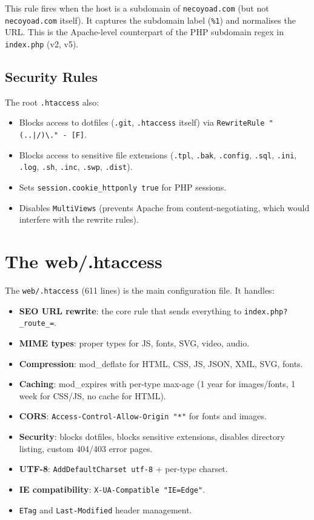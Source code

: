 \documentclass[11pt,a4paper]{article}
\begin{document}
This rule fires when the host is a subdomain of
\texttt{necoyoad.com} (but not \texttt{necoyoad.com} itself). It
captures the subdomain label (\texttt{\%1}) and normalises the URL.
This is the Apache-level counterpart of the PHP subdomain regex in
\texttt{index.php} (v2, v5).

\subsection{Security Rules}

The root \texttt{.htaccess} also:
\begin{itemize}[leftmargin=1.6em,itemsep=2pt]
  \item Blocks access to dotfiles (\texttt{.git}, \texttt{.htaccess}
        itself) via \texttt{RewriteRule "(..|/)\textbackslash{}." - [F]}.
  \item Blocks access to sensitive file extensions
        (\texttt{.tpl}, \texttt{.bak}, \texttt{.config}, \texttt{.sql},
        \texttt{.ini}, \texttt{.log}, \texttt{.sh}, \texttt{.inc},
        \texttt{.swp}, \texttt{.dist}).
  \item Sets \texttt{session.cookie\_httponly true} for PHP sessions.
  \item Disables \texttt{MultiViews} (prevents Apache from
        content-negotiating, which would interfere with the rewrite
        rules).
\end{itemize}

\section{The web/.htaccess}\label{sec:web-htaccess}

The \texttt{web/.htaccess} (611 lines) is the main configuration file.
It handles:

\begin{itemize}[leftmargin=1.6em,itemsep=2pt]
  \item \textbf{SEO URL rewrite}: the core rule that sends everything
        to \texttt{index.php?\_route\_=}.
  \item \textbf{MIME types}: proper types for JS, fonts, SVG, video,
        audio.
  \item \textbf{Compression}: mod\_deflate for HTML, CSS, JS, JSON,
        XML, SVG, fonts.
  \item \textbf{Caching}: mod\_expires with per-type max-age (1 year
        for images/fonts, 1 week for CSS/JS, no cache for HTML).
  \item \textbf{CORS}: \texttt{Access-Control-Allow-Origin "*"} for
        fonts and images.
  \item \textbf{Security}: blocks dotfiles, blocks sensitive
        extensions, disables directory listing, custom 404/403
        error pages.
  \item \textbf{UTF-8}: \texttt{AddDefaultCharset utf-8} + per-type
        charset.
  \item \textbf{IE compatibility}: \texttt{X-UA-Compatible "IE=Edge"}.
  \item \texttt{ETag} and \texttt{Last-Modified} header management.
\end{itemize}
\end{document}
